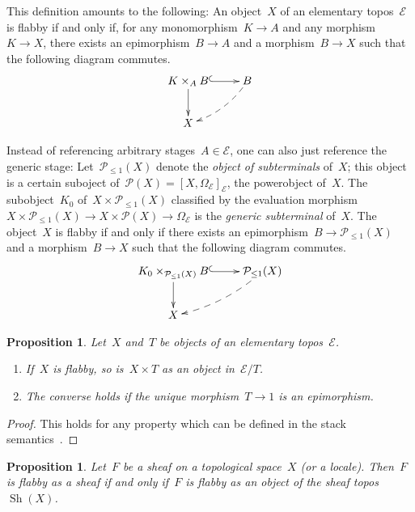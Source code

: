 \documentclass[oneside]{amsart}
\theoremstyle{definition}
\theoremstyle{plain}
\newtheorem{prop}[defn]{Proposition}
\theoremstyle{remark}
\newcommand{\E}{\mathcal{E}}
\renewcommand{\P}{\mathcal{P}}
\DeclareMathOperator{\Sh}{Sh}
\renewcommand{\_}{\mathpunct{.}\,}
\begin{document}
This definition amounts to the following: An object~$X$ of an elementary
topos~$\E$ is flabby if and only if, for any monomorphism~$K \to A$ and any
morphism~$K \to X$, there exists an epimorphism~$B \to A$ and a morphism~$B
\to X$ such that the following diagram commutes.
\[ \xymatrix{
  K \times_A B \ar@{^{(}->}[r]\ar[d] & B \ar@{-->}@/^/[ld] \\
  X
} \]

Instead of referencing arbitrary stages~$A \in \E$, one can also just reference
the generic stage: Let~$\P_{\leq1}(X)$ denote the \emph{object of subterminals}
of~$X$; this object is a certain suboject of~$\P(X) = [X,\Omega_\E]_\E$, the
powerobject of~$X$. The subobject~$K_0$ of~$X \times \P_{\leq1}(X)$ classified by the
evaluation morphism~$X \times \P_{\leq1}(X) \to X \times \P(X) \to \Omega_\E$
is the \emph{generic subterminal} of~$X$. The object~$X$ is flabby if and only
if there exists an epimorphism~$B \to \P_{\leq1}(X)$ and a morphism~$B \to X$
such that the following diagram commutes.
\[ \xymatrix{
  K_0 \times_{\P_{\leq1}(X)} B \ar@{^{(}->}[r]\ar[d] & \P_{\leq1}(X) \ar@{-->}@/^/[ld] \\
  X
} \]

\begin{prop}\label{prop:basic-properties-of-flabby-objects}
Let~$X$ and~$T$ be objects of an elementary topos~$\E$.
\begin{enumerate}
\item If~$X$ is flabby, so is~$X \times T$ as an object in~$\E/T$.
\item The converse holds if the unique morphism~$T \to 1$ is an epimorphism.
\end{enumerate}
\end{prop}

\begin{proof}This holds for any property which can be defined
in the stack semantics~\cite[Lemma~7.3]{shulman:stack-semantics}.
\end{proof}

\begin{prop}\label{prop:flabby-sheaves-objects}
Let~$F$ be a sheaf on a topological space~$X$ (or a locale).
Then~$F$ is flabby as a sheaf if and only if~$F$ is flabby as an object of the
sheaf topos~$\Sh(X)$.
\end{prop}
\end{document}
